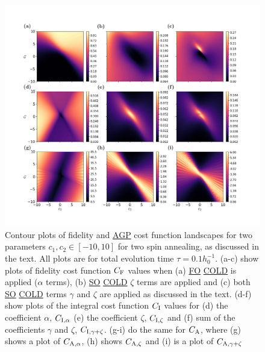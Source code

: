 \documentclass[a4paper,oneside,11pt]{book}
\newcommand{\acrref}[1]{\hyperref[acr:#1]{#1}}
\begin{document}
\begin{figure}[t!]
    \centering
    \includegraphics[width=\linewidth]{images/two_spin_contours.png} \caption[Two-spin annealing contour plots for final state fidelity and AGP cost function values.]{Contour plots of fidelity and \acrref{AGP} cost function landscapes for two parameters $c_1, c_2 \in [-10, 10]$ for two spin annealing, as discussed in the text. All plots are for total evolution time $\tau = 0.1 h_0^{-1}$. (a-c) show plots of fidelity cost function $C_{\rm F}$ values when (a) \acrref{FO} \acrref{COLD} is applied ($\alpha$ terms), (b) \acrref{SO} \acrref{COLD} $\zeta$ terms are applied and (c) both \acrref{SO} \acrref{COLD} terms $\gamma$ and $\zeta$ are applied as discussed in the text. (d-f) show plots of the integral cost function $C_{\rm I}$ values for (d) the coefficient $\alpha$, $C_{\rm I, \alpha}$ (e) the coefficient $\zeta$, $C_{\rm I, \zeta}$ and (f) sum of the coefficients $\gamma$ and $\zeta$, $C_{\rm I, \gamma + \zeta}$. (g-i) do the same for $C_{\rm A}$, where (g) shows a plot of $C_{\rm A, \alpha}$, (h) shows $C_{\rm A, \zeta}$ and (i) is a plot of $C_{\rm A, \gamma + \zeta}$}\label{fig:two_spin_higher_order}
\end{figure}
\end{document}

